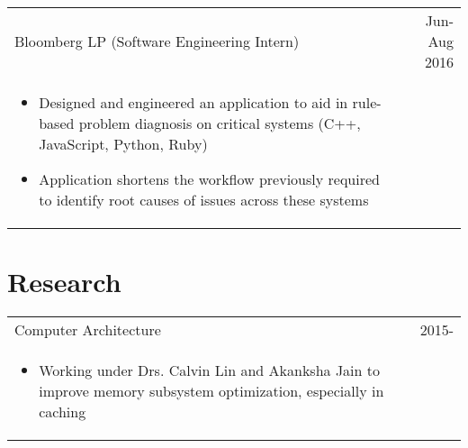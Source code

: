 \documentclass[9pt]{extarticle}
\begin{document}
\begin{tabularx}{\textwidth}{X r }
    Bloomberg LP (Software Engineering Intern) & Jun-Aug 2016 \\
    \vspace{-2mm}
    \begin{itemize}[noitemsep,topsep=0pt]
        \item Designed and engineered an application to aid in rule-based problem diagnosis on
                critical systems (C++, JavaScript, Python, Ruby)
        \item Application shortens the workflow previously required to identify root causes of issues
                across these systems
    \end{itemize} & \\
\end{tabularx}

\section*{Research}
\begin{tabularx}{\textwidth}{X r }
    Computer Architecture & 2015- \\
    \vspace{-2mm}
    \begin{itemize}[noitemsep,topsep=0pt]
        \item Working under Drs. Calvin Lin and Akanksha Jain to improve memory
                subsystem optimization, especially in caching
    \end{itemize} & \\
\end{tabularx}
\end{document}
